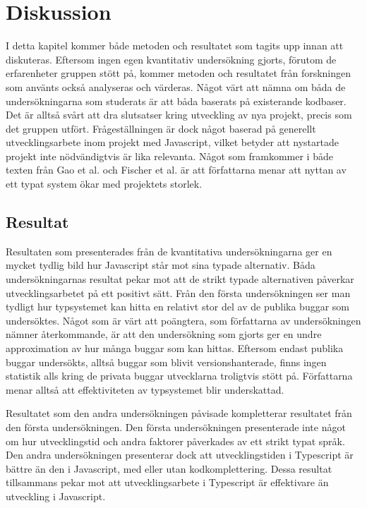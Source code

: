 \section{Diskussion}
\label{sec:alexander-discussion}

I detta kapitel kommer både metoden och resultatet som tagits upp innan att diskuteras. Eftersom ingen egen kvantitativ undersökning gjorts, förutom de erfarenheter gruppen stött på, kommer metoden och resultatet från forskningen som använts också analyseras och värderas.  Något värt att nämna om båda de undersökningarna som studerats är att båda baserats på existerande kodbaser. Det är alltså svårt att dra slutsatser kring utveckling av nya projekt, precis som det gruppen utfört. Frågeställningen är dock något baserad på generellt utvecklingsarbete inom projekt med Javascript, vilket betyder att nystartade projekt inte nödvändigtvis är lika relevanta. Något som framkommer i både texten från Gao et al. och Fischer et al. är att författarna menar att nyttan av ett typat system ökar med projektets storlek. 



\subsection{Resultat}
\label{subsec:alexander-discussion-results}

Resultaten som presenterades från de kvantitativa undersökningarna ger en mycket tydlig bild hur Javascript står mot sina typade alternativ. Båda undersökningarnas resultat pekar mot att de strikt typade alternativen påverkar utvecklingsarbetet på ett positivt sätt. Från den första undersökningen ser man tydligt hur typsystemet kan hitta en relativt stor del av de publika buggar som undersöktes. Något som är värt att poängtera, som författarna av undersökningen nämner återkommande, är att den undersökning som gjorts ger en undre approximation av hur många buggar som kan hittas. Eftersom endast publika buggar undersökts, alltså buggar som blivit versionshanterade, finns ingen statistik alls kring de privata buggar utvecklarna troligtvis stött på. Författarna menar alltså att effektiviteten av typsystemet blir underskattad.

Resultatet som den andra undersökningen påvisade kompletterar resultatet från den första undersökningen.  Den första undersökningen presenterade inte något om hur utvecklingstid och andra faktorer påverkades av ett strikt typat språk. Den andra undersökningen presenterar dock att utvecklingstiden i Typescript är bättre än den i Javascript, med eller utan kodkomplettering. Dessa resultat tillsammans pekar mot att utvecklingsarbete i Typescript är effektivare än utveckling i Javascript. 

